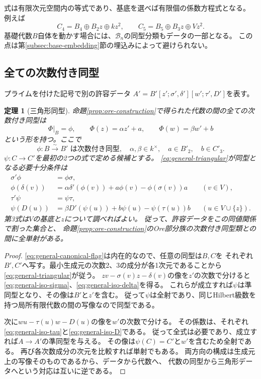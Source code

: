 \documentclass[11pt,a4paper]{ltjsarticle}
\newtheorem{theorem}{定理}[section]
\theoremstyle{definition}
\newcommand{\Bclass}{\mathcal B}
\begin{document}
式は有限次元空間内の等式であり、基底を選べば有限個の係数方程式となる。
例えば
\[
C_4=B_4\oplus B_2z\oplus kz^2,\qquad
C_5=B_5\oplus B_3z\oplus Vz^2.
\]
基礎代数$B$自体を動かす場合には、$\Bclass_n$の同型分類もデータの一部となる。
この点は第\ref{subsec:base-embedding}節の埋込みによって避けられない。

\subsection{全ての次数付き同型}
プライムを付けた記号で別の許容データ
$A'=B'[z';\sigma',\delta'][w';\tau',D']$を表す。

\begin{theorem}[三角形同型]\label{thm:general-isomorphisms}
命題\ref{prop:ore-construction}で得られた代数の間の全ての次数付き同型は
\begin{equation}\label{eq:general-triangular}
\Phi|_B=\phi,\qquad
\Phi(z)=\alpha z'+a,\qquad
\Phi(w)=\beta w'+b
\end{equation}
という形を持つ。ここで
\[
\phi:B\xrightarrow{\sim}B'\text{ は次数付き同型},\quad
\alpha,\beta\in k^\times,\quad a\in B'_2,\quad b\in C'_3.
\]
$\psi:C\to C'$を最初の2つの式で定める候補とする。
\eqref{eq:general-triangular}が同型となる必要十分条件は
\begin{align}
\sigma'\phi&=\phi\sigma,\label{eq:general-iso-sigma}\\
\phi(\delta(v))&=\alpha\delta'(\phi(v))
                 +a\phi(v)-\phi(\sigma(v))a
&& (v\in V),\label{eq:general-iso-delta}\\
\tau'\psi&=\psi\tau,\label{eq:general-iso-tau}\\
\psi(D(u))&=\beta D'(\psi(u))+b\psi(u)-\psi(\tau(u))b
&& (u\in V\cup\{z\}).\label{eq:general-iso-D}
\end{align}
第3式は$V$の基底と$z$について調べればよい。
従って、許容データをこの同値関係で割った集合と、
命題\ref{prop:ore-construction}のOre部分族の次数付き同型類との間に全単射がある。
\end{theorem}

\begin{proof}
\eqref{eq:general-canonical-flag}は内在的なので、任意の同型は$B,C$を
それぞれ$B',C'$へ写す。最小生成元の次数2、3の成分が各1次元であることから
\eqref{eq:general-triangular}が従う。
$zv-\sigma(v)z-\delta(v)$の像を$z'$の次数で分けると
\eqref{eq:general-iso-sigma}、\eqref{eq:general-iso-delta}を得る。
これらが成立すれば$\psi$は準同型となり、その像は$B'$と$z'$を含む。
従って$\psi$は全射であり、同じHilbert級数を持つ局所有限代数の間の写像なので同型である。

次に$wu-\tau(u)w-D(u)$の像を$w'$の次数で分ける。
その係数は、それぞれ\eqref{eq:general-iso-tau}と\eqref{eq:general-iso-D}である。
従って全式は必要であり、成立すれば$A\to A'$の準同型を与える。
その像は$\psi(C)=C'$と$w'$を含むため全射である。
再び各次数成分の次元を比較すれば単射でもある。
両方向の構成は生成元上の写像そのものであるから、データから代数へ、
代数の同型から三角形データへという対応は互いに逆である。
\end{proof}
\end{document}
